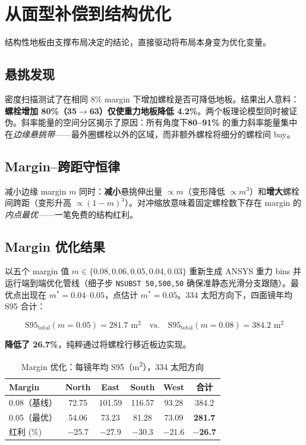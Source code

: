 \documentclass[12pt,a4paper]{ctexart}
\begin{document}
\section{从面型补偿到结构优化}
\label{sec:structural}

结构性地板由支撑布局决定的结论，直接驱动将布局本身变为优化变量。

\subsection{悬挑发现}

密度扫描测试了在相同 8\% margin 下增加螺栓是否可降低地板。结果出人意料：\textbf{螺栓增加 80\%（35$\to$63）仅使重力地板降低 4.2\%}。两个板理论模型同时被证伪。斜率能量的空间分区揭示了原因：所有角度下\textbf{80--91\%} 的重力斜率能量集中在\emph{边缘悬挑带}——最外圈螺栓以外的区域，而非额外螺栓将细分的螺栓间 bay。

\subsection{Margin--跨距守恒律}

减小边缘 margin $m$ 同时：\textbf{减小}悬挑伸出量 $\propto m$（变形降低 $\propto m^3$）和\textbf{增大}螺栓间跨距（变形升高 $\propto (1-m)^3$）。对冲缩放意味着固定螺栓数下存在 margin 的\emph{内点最优}——一笔免费的结构红利。

\subsection{Margin 优化结果}

以五个 margin 值 $m \in \{0.08, 0.06, 0.05, 0.04, 0.03\}$ 重新生成 ANSYS 重力 bins 并运行端到端优化管线（细子步 \verb|NSUBST 50,500,50| 确保准静态光滑分支跟随）。最优点出现在 $m^* = 0.04$--$0.05$，点估计 $m^* = 0.05$。334 太阳方向下，四面镜年均 S95 合计：

\begin{equation}
\text{S95}_{\text{total}}(m{=}0.05) = 281.7\text{ m}^2 \quad\text{vs.}\quad
\text{S95}_{\text{total}}(m{=}0.08) = 384.2\text{ m}^2
\label{eq:final}
\end{equation}

\textbf{降低了 26.7\%}，纯粹通过将螺栓行移近板边实现。

\begin{table}[t]
\centering
\caption{Margin 优化：每镜年均 S95（m\textsuperscript{2}），334 太阳方向}
\label{tab:margin}
\small
\begin{tabular}{lccccc}
\toprule
Margin & North & East & South & West & 合计 \\
\midrule
0.08（基线） & 72.75 & 101.59 & 116.57 & 93.28 & 384.2 \\
0.05（最优）  & 54.06 &  73.23 &  81.28 & 73.09 & \textbf{281.7} \\
\midrule
红利 (\%)    & $-$25.7 & $-$27.9 & $-$30.3 & $-$21.6 & \textbf{$-$26.7} \\
\bottomrule
\end{tabular}
\end{table}
\end{document}
